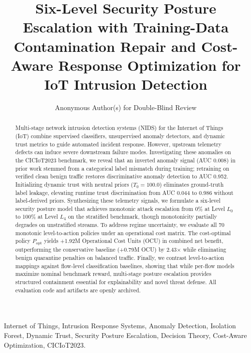 \documentclass[journal,10pt,onecolumn]{IEEEtran}
\begin{document}
\title{Six-Level Security Posture Escalation with Training-Data Contamination Repair and Cost-Aware Response Optimization for IoT Intrusion Detection}

\author{Anonymous Author(s) for Double-Blind Review}

\maketitle

\begin{abstract}
Multi-stage network intrusion detection systems (NIDS) for the Internet of Things (IoT) combine supervised classifiers, unsupervised anomaly detectors, and dynamic trust metrics to guide automated incident response. However, upstream telemetry defects can induce severe downstream failure modes. Investigating these anomalies on the CICIoT2023 benchmark, we reveal that an inverted anomaly signal (AUC 0.008) in prior work stemmed from a categorical label mismatch during training; retraining on verified clean benign traffic restores discriminative anomaly detection to AUC 0.952. Initializing dynamic trust with neutral priors ($T_0 = 100.0$) eliminates ground-truth label leakage, elevating runtime trust discrimination from AUC 0.044 to 0.986 without label-derived priors. Synthesizing these telemetry signals, we formulate a six-level security posture model that achieves monotonic attack escalation from 0\% at Level $L_0$ to 100\% at Level $L_4$ on the stratified benchmark, though monotonicity partially degrades on unstratified streams. To address regime uncertainty, we evaluate all 70 monotonic level-to-action policies under an operational cost matrix. The cost-optimal policy $P_{\text{opt}}$ yields +1.92M Operational Cost Units (OCU) in combined net benefit, outperforming the conservative baseline (+0.79M OCU) by 2.43$\times$ while eliminating benign quarantine penalties on balanced traffic. Finally, we contrast level-to-action mappings against flow-level classification baselines, showing that while per-flow models maximize nominal benchmark reward, multi-stage posture escalation provides structured containment essential for explainability and novel threat defense. All evaluation code and artifacts are openly archived.
\end{abstract}

\begin{IEEEkeywords}
Internet of Things, Intrusion Response Systems, Anomaly Detection, Isolation Forest, Dynamic Trust, Security Posture Escalation, Decision Theory, Cost-Aware Optimization, CICIoT2023.
\end{IEEEkeywords}
\end{document}
